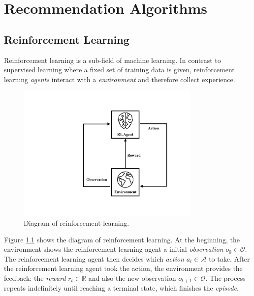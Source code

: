 
\chapter{Recommendation Algorithms}


\section{Reinforcement Learning}

    Reinforcement learning is a sub-field of machine learning.
    In contrast to supervised learning where a fixed set of training data is given,
    reinforcement learning \emph{agents} interact with a \emph{environment} and therefore collect experience.

    \begin{figure}[!htp]
        \centering
        \includegraphics[width=0.8\textwidth]{img/rl.pdf}
        \caption{Diagram of reinforcement learning.}
        \label{fig:rl}
    \end{figure}

    Figure \ref{fig:rl} shows the diagram of reinforcement learning.
    At the beginning, the environment shows the reinforcement learning agent
    a initial \emph{observation} $o_0 \in \mathcal{O}$.
    The reinforcement learning agent then decides which \emph{action} $a_t \in \mathcal{A}$ to take.
    After the reinforcement learning agent took the action,
    the environment provides the feedback: the \emph{reward} $r_t \in \mathbb{R}$
    and also the new observation $o_{t+1} \in \mathcal{O}$.
    The process repeats indefinitely until reaching a terminal state,
    which finishes the \emph{episode}.

